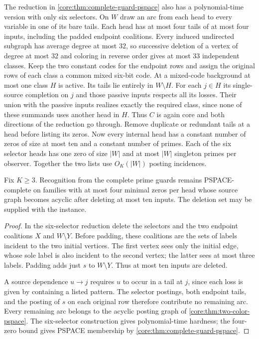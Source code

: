The reduction in \cref{core:thm:complete-guard-pspace} also has a
polynomial-time version with only six selectors.
On $W$ draw an arc from each head to every variable in one of its
bare tails. Each head has at most four tails of at most four inputs,
including the padded endpoint coalitions. Every induced undirected
subgraph has average degree at most $32$, so successive deletion
of a vertex of degree at most $32$ and coloring in reverse order
gives at most $33$ independent classes. Keep the two constant
codes for the endpoint rows and assign the original rows of each
class a common mixed six-bit code. At a mixed-code background at
most one class $H$ is active. Its tails lie entirely in $W\setminus H$.
For each $j\in H$ its single-source completion on $j$ and those
passive inputs respects all its losses. Their union with the
passive inputs realizes exactly the required class, since none of
these summands uses another head in $H$. Thus $C$ is again core
and both directions of the reduction go through. Remove duplicate
or redundant tails at a head before listing its zeros. Now every
internal head has a constant number of zeros of size at most ten
and a constant number of primes. Each of the six selector heads
has one zero of size $|W|$ and at most $|W|$ singleton primes per
observer. Together the two lists use $O_K(|W|)$ posting incidences.

\begin{corollary}
\label{core:cor:source-feedback-hardness}
Fix $K\ge3$. Recognition from the complete prime guards remains
PSPACE-complete on families with at most four minimal zeros per
head whose source graph becomes acyclic after deleting at most ten
inputs. The deletion set may be supplied with the instance.
\end{corollary}
\begin{proof}
In the six-selector reduction delete the selectors and the two
endpoint coalitions $X$ and $W\setminus Y$. Before padding, these
coalitions are the sets of labels incident to the two initial
vertices. The first vertex sees only the initial edge, whose sole
label is also incident to the second vertex; the latter sees at
most three labels. Padding adds just $s$ to $W\setminus Y$.
Thus at most ten inputs are deleted.

A source dependence $u\to j$ requires $u$ to occur in a tail at
$j$, since each loss is given by containing a listed pattern.
The selector postings, both endpoint tails, and the posting of $s$
on each original row therefore contribute no remaining arc.
Every remaining arc belongs to the acyclic posting graph of
\cref{core:thm:two-color-pspace}.
The six-selector construction gives polynomial-time hardness;
the four-zero bound gives PSPACE membership by
\cref{core:thm:complete-guard-pspace}.
\end{proof}

